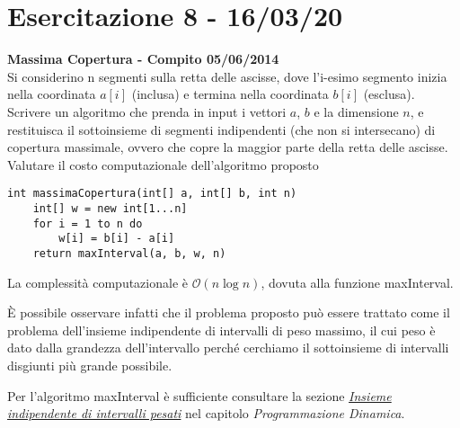 \documentclass[../cheatSheetAlgoritmi.tex]{subfiles}
\begin{document}
\section{Esercitazione 8 - 16/03/20}
\textbf{Massima Copertura - Compito 05/06/2014}\\
Si considerino n segmenti sulla retta delle ascisse, dove l'i-esimo segmento inizia nella coordinata $a[i]$ (inclusa) e termina nella coordinata $b[i]$ (esclusa). Scrivere un algoritmo che prenda in input i vettori $a$, $b$ e la dimensione $n$, e restituisca il sottoinsieme di segmenti indipendenti (che non si intersecano) di copertura massimale, ovvero che copre la maggior parte della retta delle ascisse. Valutare il costo computazionale dell'algoritmo proposto
\begin{lstlisting}[caption=Massima copertura]
int massimaCopertura(int[] a, int[] b, int n)
    int[] w = new int[1...n]
    for i = 1 to n do
        w[i] = b[i] - a[i]
    return maxInterval(a, b, w, n)
\end{lstlisting}

La complessità computazionale è $\mathcal{O}(n \log n)$, dovuta alla funzione maxInterval. 

È possibile osservare infatti che il problema proposto può essere trattato come il problema \hfill \break dell'insieme indipendente di intervalli di peso massimo, il cui peso è dato dalla grandezza \hfill \break dell'intervallo perché cerchiamo il sottoinsieme di intervalli disgiunti più grande possibile.
 
Per l'algoritmo maxInterval è sufficiente consultare la sezione \hyperref[sec:indSet]{\emph{Insieme indipendente di intervalli pesati}} nel capitolo \emph{Programmazione Dinamica}.
\end{document}
